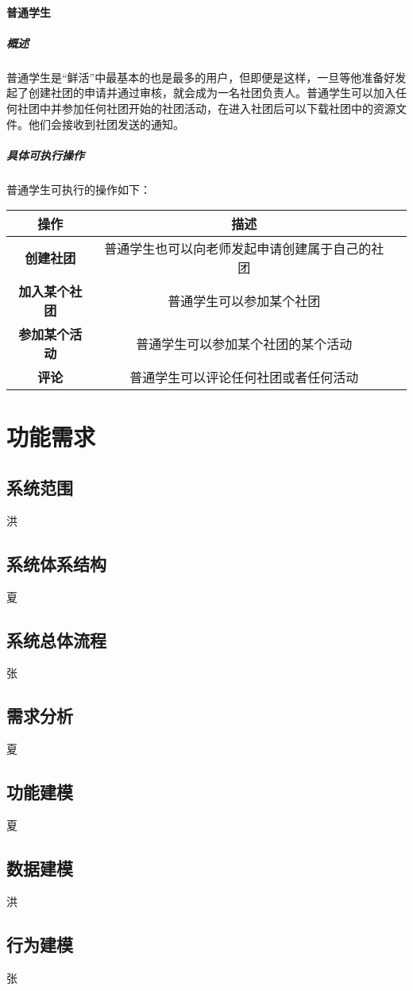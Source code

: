 \documentclass[UTF8]{ctexart}
\begin{document}
\paragraph{普通学生}
\subparagraph{概述}
普通学生是“鲜活”中最基本的也是最多的用户，但即便是这样，一旦等他准备好发起了创建社团的申请并通过审核，就会成为一名社团负责人。普通学生可以加入任何社团中并参加任何社团开始的社团活动，在进入社团后可以下载社团中的资源文件。他们会接收到社团发送的通知。
\subparagraph{具体可执行操作}
普通学生可执行的操作如下：
\newline
\newline
\begin{tabular}{ccc}
\toprule
操作& 描述\\
\midrule
\textbf{创建社团}& 普通学生也可以向老师发起申请创建属于自己的社团\\
\textbf{加入某个社团}& 普通学生可以参加某个社团\\
\textbf{参加某个活动}& 普通学生可以参加某个社团的某个活动\\
\textbf{评论}& 普通学生可以评论任何社团或者任何活动\\
\bottomrule
\end{tabular}



\section{功能需求}
\subsection{系统范围}
洪
\subsection{系统体系结构}
夏
\subsection{系统总体流程}
张
\subsection{需求分析}
夏
\subsection{功能建模}
夏
\subsection{数据建模}
洪
\subsection{行为建模}
张
\end{document}
